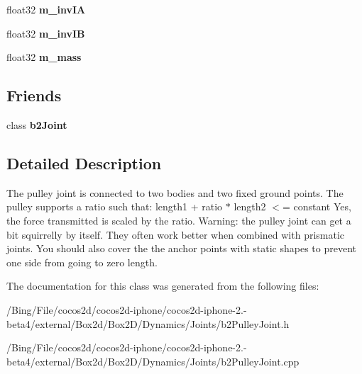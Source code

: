 \begin{DoxyCompactItemize}
\item 
\hypertarget{classb2_pulley_joint_a701fbc685109f5b397b968be2407b123}{float32 {\bfseries m\-\_\-inv\-I\-A}}\label{classb2_pulley_joint_a701fbc685109f5b397b968be2407b123}

\item 
\hypertarget{classb2_pulley_joint_a19278e2f7dcec7275aff55b1d760b398}{float32 {\bfseries m\-\_\-inv\-I\-B}}\label{classb2_pulley_joint_a19278e2f7dcec7275aff55b1d760b398}

\item 
\hypertarget{classb2_pulley_joint_a60efdc42d9fd8f4c50f96eb68ff3f191}{float32 {\bfseries m\-\_\-mass}}\label{classb2_pulley_joint_a60efdc42d9fd8f4c50f96eb68ff3f191}

\end{DoxyCompactItemize}
\subsection*{Friends}
\begin{DoxyCompactItemize}
\item 
\hypertarget{classb2_pulley_joint_a54ade8ed3d794298108d7f4c4e4793fa}{class {\bfseries b2\-Joint}}\label{classb2_pulley_joint_a54ade8ed3d794298108d7f4c4e4793fa}

\end{DoxyCompactItemize}


\subsection{Detailed Description}
The pulley joint is connected to two bodies and two fixed ground points. The pulley supports a ratio such that\-: length1 + ratio $\ast$ length2 $<$= constant Yes, the force transmitted is scaled by the ratio. Warning\-: the pulley joint can get a bit squirrelly by itself. They often work better when combined with prismatic joints. You should also cover the the anchor points with static shapes to prevent one side from going to zero length. 

The documentation for this class was generated from the following files\-:\begin{DoxyCompactItemize}
\item 
/\-Bing/\-File/cocos2d/cocos2d-\/iphone/cocos2d-\/iphone-\/2.-\/beta4/external/\-Box2d/\-Box2\-D/\-Dynamics/\-Joints/b2\-Pulley\-Joint.\-h\item 
/\-Bing/\-File/cocos2d/cocos2d-\/iphone/cocos2d-\/iphone-\/2.-\/beta4/external/\-Box2d/\-Box2\-D/\-Dynamics/\-Joints/b2\-Pulley\-Joint.\-cpp\end{DoxyCompactItemize}
